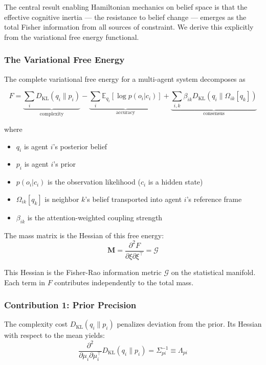 \documentclass[12pt]{article}
\begin{document}
The central result enabling Hamiltonian mechanics on belief space is that the effective cognitive inertia — the resistance to belief change — emerges as the total Fisher information from all sources of constraint. We derive this explicitly from the variational free energy functional.

\subsubsection{The Variational Free Energy}

The complete variational free energy for a multi-agent system decomposes as

\begin{equation}
F = \underbrace{\sum_i D_{\mathrm{KL}}(q_i \| p_i)}_{\text{complexity}} - \underbrace{\sum_i \mathbb{E}_{q_i}[\log p(o_i|c_i)]}_{\text{accuracy}} + \underbrace{\sum_{i,k} \beta_{ik} D_{\mathrm{KL}}(q_i \| \Omega_{ik}[q_k])}_{\text{consensus}}
\end{equation}

where

\begin{itemize}
    \item $q_i$ is agent $i$'s posterior belief
    \item $p_i$ is agent $i$'s prior
    \item $p(o_i|c_i)$ is the observation likelihood ($c_i$ is a hidden state)
    \item $\Omega_{ik}[q_k]$ is neighbor $k$'s belief transported into agent $i$'s reference frame
    \item $\beta_{ik}$ is the attention-weighted coupling strength
\end{itemize}

The mass matrix is the Hessian of this free energy:
\begin{equation}
\mathbf{M} = \frac{\partial^2 F}{\partial\xi\partial\xi^\top} = \mathcal{G}
\end{equation}

This Hessian is the Fisher-Rao information metric $\mathcal{G}$ on the statistical manifold. Each term in $F$ contributes independently to the total mass.

\subsubsection{Contribution 1: Prior Precision}

The complexity cost $D_{\mathrm{KL}}(q_i \| p_i)$ penalizes deviation from the prior. Its Hessian with respect to the mean yields:
\begin{equation}
\frac{\partial^2}{\partial\mu_i\partial\mu_i^\top} D_{\mathrm{KL}}(q_i \| p_i) = \Sigma_{pi}^{-1} \equiv \Lambda_{pi}
\end{equation}
\end{document}

